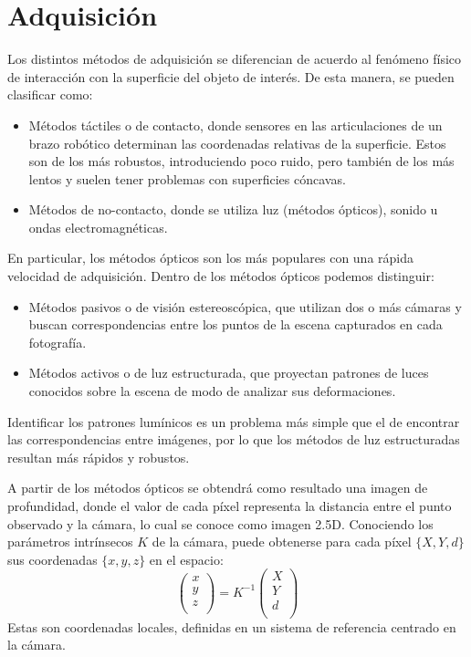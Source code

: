 \section{Adquisición}
Los distintos métodos de adquisición se diferencian de acuerdo al fenómeno físico de interacción
con la superficie del objeto de interés. De esta manera, se pueden clasificar como:
	\begin{itemize}
		\item Métodos táctiles o de contacto, donde sensores en las articulaciones de un brazo robótico determinan las coordenadas relativas de la superficie. Estos son de los más robustos, introduciendo poco ruido, pero también de los más lentos y suelen tener problemas con superficies cóncavas.
		\item Métodos de no-contacto, donde se utiliza luz (métodos ópticos), sonido u ondas electromagnéticas.
	\end{itemize}

En particular, los métodos ópticos son los más populares con una rápida velocidad de adquisición\cite{Várady97reverseengineering}. %
Dentro de los métodos ópticos podemos distinguir:
\begin{itemize}
	\item Métodos pasivos o de visión estereoscópica,
		que utilizan dos o más cámaras y buscan correspondencias
		entre los puntos de la escena capturados en cada fotografía.
	\item Métodos activos o de luz estructurada,
		que proyectan patrones de luces conocidos sobre la escena de modo de analizar sus deformaciones.
\end{itemize}
Identificar los patrones lumínicos es un problema más simple que el de
encontrar las correspondencias entre imágenes, por lo que los métodos de luz
estructuradas resultan más rápidos y robustos\cite{Pancho}.

A partir de los métodos ópticos se obtendrá como resultado una imagen de profundidad, donde el valor de
cada píxel representa la distancia entre el punto observado y la cámara, lo cual se conoce como imagen 2.5D.
Conociendo los parámetros intrínsecos $K$ de la cámara,
puede obtenerse para cada píxel $\{X, Y, d\}$ sus coordenadas $\{x, y, z\}$ en el espacio:
\[
	\left(\begin{matrix}
		x \\ y \\ z \\
	\end{matrix}\right) =
	K^{-1}
	\left(\begin{matrix}
		X \\ Y \\ d \\
	\end{matrix}\right)
\]
Estas son coordenadas locales, definidas en un sistema de referencia centrado en la cámara.


